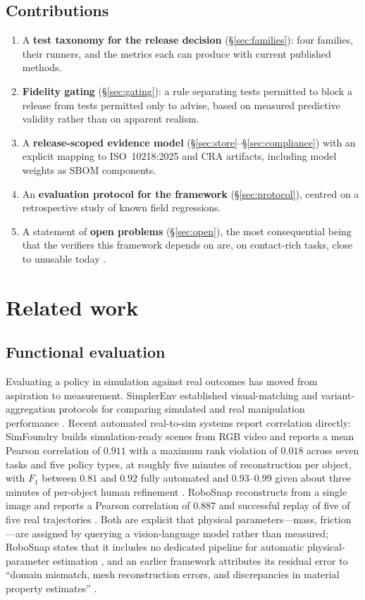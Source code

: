\documentclass[11pt]{article}
\theoremstyle{definition}
\begin{document}
\subsection{Contributions}

\begin{enumerate}[leftmargin=1.4em]
  \item A \textbf{test taxonomy for the release decision} (\S\ref{sec:families}): four
  families, their runners, and the metrics each can produce with current published methods.
  \item \textbf{Fidelity gating} (\S\ref{sec:gating}): a rule separating tests permitted to
  block a release from tests permitted only to advise, based on measured predictive validity
  rather than on apparent realism.
  \item A \textbf{release-scoped evidence model} (\S\ref{sec:store}--\S\ref{sec:compliance})
  with an explicit mapping to ISO~10218:2025 and CRA artifacts, including model weights as
  SBOM components.
  \item An \textbf{evaluation protocol for the framework} (\S\ref{sec:protocol}), centred on
  a retrospective study of known field regressions.
  \item A statement of \textbf{open problems} (\S\ref{sec:open}), the most consequential
  being that the verifiers this framework depends on are, on contact-rich tasks, close to
  unusable today \citep{failbench}.
\end{enumerate}

\section{Related work}

\subsection{Functional evaluation}

Evaluating a policy in simulation against real outcomes has moved from aspiration to
measurement. SimplerEnv established visual-matching and variant-aggregation protocols for
comparing simulated and real manipulation performance \citep{simplerenv}. Recent automated
real-to-sim systems report correlation directly: SimFoundry builds simulation-ready scenes
from RGB video and reports a mean Pearson correlation of $0.911$ with a maximum rank
violation of $0.018$ across seven tasks and five policy types, at roughly five minutes of
reconstruction per object, with $F_1$ between $0.81$ and $0.92$ fully automated and
$0.93$--$0.99$ given about three minutes of per-object human refinement \citep{simfoundry}.
RoboSnap reconstructs from a single image and reports a Pearson correlation of $0.887$ and
successful replay of five of five real trajectories \citep{robosnap}. Both are explicit that
physical parameters---mass, friction---are assigned by querying a vision-language model
rather than measured; RoboSnap states that it includes no dedicated pipeline for automatic
physical-parameter estimation \citep{robosnap}, and an earlier framework attributes its
residual error to ``domain mismatch, mesh reconstruction errors, and discrepancies in
material property estimates'' \citep{scanmatsim}.
\end{document}
